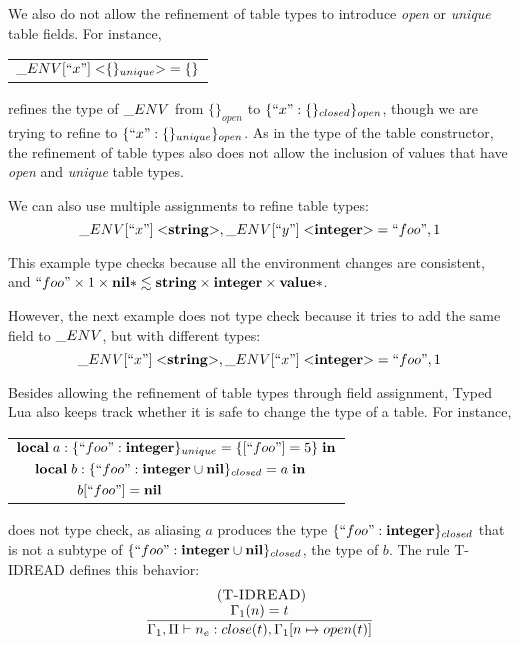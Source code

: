 We also do not allow the refinement of table types to introduce
\emph{open} or \emph{unique} table fields.
For instance,
\begin{center}
\begin{tabular}{l}
$\string_ENV[``x"] \; {<}\{\}_{unique}{>} = \{\}$
\end{tabular}
\end{center}
refines the type of $\string_ENV$ from $\{\}_{open}$ to $\{``x":\{\}_{closed}\}_{open}$,
though we are trying to refine to $\{``x":\{\}_{unique}\}_{open}$.
As in the type of the table constructor, the refinement of
table types also does not allow the inclusion of values that
have \emph{open} and \emph{unique} table types.

We can also use multiple assignments to refine table types:
\[
\string_ENV[``x"] \; {<}\String{>}, \string_ENV[``y"] \; {<}\Integer{>} = ``foo", 1
\]

This example type checks because all the environment changes are consistent, and
$``foo" \times 1 \times \mathbf{nil}{*} \lesssim \mathbf{string} \times \mathbf{integer} \times \mathbf{value}{*}$.

However, the next example does not type check because it tries to add
the same field to $\string_ENV$, but with different types:
\[
\string_ENV[``x"] \; {<}\String{>}, \string_ENV[``x"] \; {<}\Integer{>} = ``foo", 1
\]

Besides allowing the refinement of table types through field assignment,
Typed Lua also keeps track whether it is safe to change the type of a table.
For instance,
\begin{center}
\begin{tabular}{lll}
\multicolumn{3}{l}{$\mathbf{local} \; a:\{``foo":\mathbf{integer}\}_{unique} = \{ [``foo"] = 5 \} \; \mathbf{in}$}\\
& \multicolumn{2}{l}{$\mathbf{local} \; b:\{``foo":\mathbf{integer} \cup \mathbf{nil} \}_{closed} = a \; \mathbf{in}$}\\
& & \multicolumn{1}{l}{$b[``foo"] = \mathbf{nil}$}
\end{tabular}
\end{center}
does not type check, as aliasing $a$ produces the type
$\{``foo":\mathbf{integer}\}_{closed}$ that is not a subtype of
$\{``foo":\mathbf{integer} \cup \mathbf{nil}\}_{closed}$, the type of $b$.
The rule \textsc{T-IDREAD} defines this behavior:
\[
\begin{array}{c}
\; (\textsc{T-IDREAD})\\
\dfrac{\Gamma_{1}(n) = t}
      {\Gamma_{1}, \Pi \vdash n_{e}:close(t), \Gamma_{1}[n \mapsto open(t)]}
\end{array}
\]

